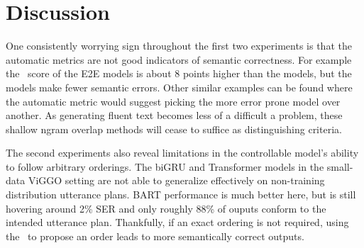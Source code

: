 \section{Discussion}

One consistently worrying sign throughout the first two experiments is that the
automatic metrics are not good indicators of semantic correctness.  For
example the \rougel~score of the E2E  models is about 8
points higher than the  models, but the 
models make fewer semantic errors. Other similar examples can be found where
the automatic metric would suggest picking the more error prone model over
another. As generating fluent text becomes less of a difficult a problem,
these shallow ngram overlap methods will cease to suffice as distinguishing
criteria.

The second experiments also reveal limitations in the controllable model's
ability to follow arbitrary orderings. The biGRU and Transformer models in the
small-data ViGGO setting are not able to generalize effectively on
non-training distribution utterance plans. BART performance is much
better here, but is still hovering around 2\% SER and only roughly 88\% of
ouputs conform to the intended utterance plan.  Thankfully, if an exact
ordering is not required, using the \NUP~to propose an order leads to more
semantically correct outputs.
